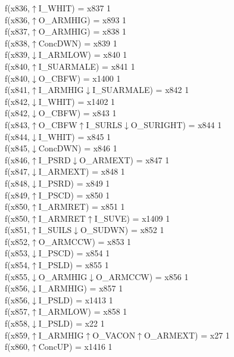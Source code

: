 f(x836,$\uparrow$I\_WHIT) = x837 {1} \\
f(x836,$\uparrow$O\_ARMHIG) = x893 {1} \\
f(x837,$\uparrow$O\_ARMHIG) = x838 {1} \\
f(x838,$\uparrow$ConcDWN) = x839 {1} \\
f(x839,$\downarrow$I\_ARMLOW) = x840 {1} \\
f(x840,$\uparrow$I\_SUARMALE) = x841 {1} \\
f(x840,$\downarrow$O\_CBFW) = x1400 {1} \\
f(x841,$\uparrow$I\_ARMHIG$\downarrow$I\_SUARMALE) = x842 {1} \\
f(x842,$\downarrow$I\_WHIT) = x1402 {1} \\
f(x842,$\downarrow$O\_CBFW) = x843 {1} \\
f(x843,$\uparrow$O\_CBFW$\uparrow$I\_SURLS$\downarrow$O\_SURIGHT) = x844 {1} \\
f(x844,$\downarrow$I\_WHIT) = x845 {1} \\
f(x845,$\downarrow$ConcDWN) = x846 {1} \\
f(x846,$\uparrow$I\_PSRD$\downarrow$O\_ARMEXT) = x847 {1} \\
f(x847,$\downarrow$I\_ARMEXT) = x848 {1} \\
f(x848,$\downarrow$I\_PSRD) = x849 {1} \\
f(x849,$\uparrow$I\_PSCD) = x850 {1} \\
f(x850,$\uparrow$I\_ARMRET) = x851 {1} \\
f(x850,$\uparrow$I\_ARMRET$\uparrow$I\_SUVE) = x1409 {1} \\
f(x851,$\uparrow$I\_SUILS$\downarrow$O\_SUDWN) = x852 {1} \\
f(x852,$\uparrow$O\_ARMCCW) = x853 {1} \\
f(x853,$\downarrow$I\_PSCD) = x854 {1} \\
f(x854,$\uparrow$I\_PSLD) = x855 {1} \\
f(x855,$\downarrow$O\_ARMHIG$\downarrow$O\_ARMCCW) = x856 {1} \\
f(x856,$\downarrow$I\_ARMHIG) = x857 {1} \\
f(x856,$\downarrow$I\_PSLD) = x1413 {1} \\
f(x857,$\uparrow$I\_ARMLOW) = x858 {1} \\
f(x858,$\downarrow$I\_PSLD) = x22 {1} \\
f(x859,$\uparrow$I\_ARMHIG$\uparrow$O\_VACON$\uparrow$O\_ARMEXT) = x27 {1} \\
f(x860,$\uparrow$ConcUP) = x1416 {1} \\
